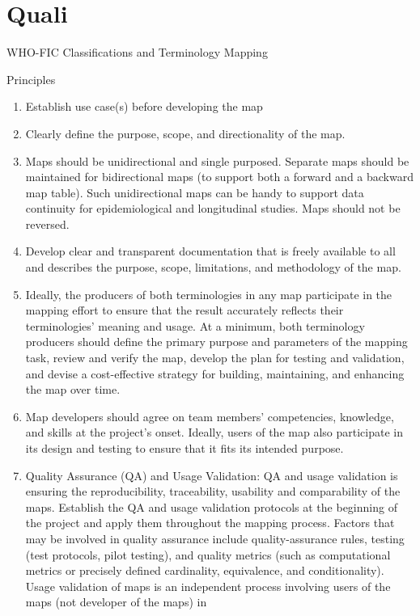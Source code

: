 \section{Quali}

WHO-FIC Classifications and Terminology Mapping

Principles

\begin{enumerate}
\item Establish use case(s) before developing the map
\item Clearly define the purpose, scope, and directionality of the map.
\item Maps should be unidirectional and single purposed. Separate maps should be
maintained for bidirectional maps (to support both a forward and a backward
map table). Such unidirectional maps can be handy to support data continuity for
epidemiological and longitudinal studies. Maps should not be reversed.
\item Develop clear and transparent documentation that is freely available to all and
describes the purpose, scope, limitations, and methodology of the map.
\item Ideally, the producers of both terminologies in any map participate in the
mapping effort to ensure that the result accurately reflects their terminologies'
meaning and usage. At a minimum, both terminology producers should define
the primary purpose and parameters of the mapping task, review and verify the
map, develop the plan for testing and validation, and devise a cost-effective
strategy for building, maintaining, and enhancing the map over time.
\item Map developers should agree on team members' competencies, knowledge, and
skills at the project's onset. Ideally, users of the map also participate in its design
and testing to ensure that it fits its intended purpose.
\item Quality Assurance (QA) and Usage Validation: QA and usage validation is
ensuring the reproducibility, traceability, usability and comparability of the maps.
Establish the QA and usage validation protocols at the beginning of the project
and apply them throughout the mapping process. Factors that may be involved
in quality assurance include quality-assurance rules, testing (test protocols, pilot
testing), and quality metrics (such as computational metrics or precisely defined
cardinality, equivalence, and conditionality). Usage validation of maps is an
independent process involving users of the maps (not developer of the maps) in

\end{enumerate}
